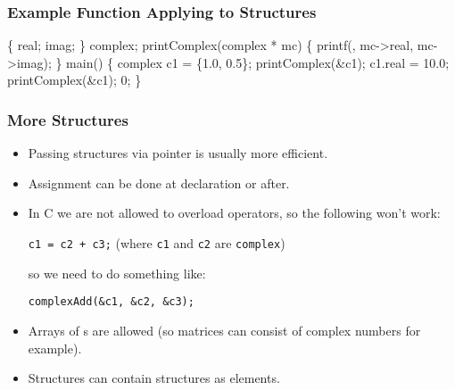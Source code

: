 \documentclass[smaller,table]{beamer} %
\begin{document}
\begin{frame}[fragile]
\frametitle{Example Function Applying to Structures}
\vspace{-0.2in}
\begin{semiverbatim}
\scriptsize
\kr\kl{} 
\kl
\kl{}
\kl\{
\kl   {} real;
\kl   {} imag;
\kl\} complex;
\kl
\kl{} printComplex(complex * mc)
\kl\{
\kl   printf(, mc->real, mc->imag);
\kl\}
\kl
\kl{} main()
\kl\{
\kl   complex c1 = \{1.0, 0.5\}; 
\kl   printComplex(&c1);       
\kl   c1.real = 10.0;          
\kl   printComplex(&c1);
\kl   {} 0;
\kl\}
\end{semiverbatim}
\end{frame}

\begin{frame}
\frametitle{More Structures}
\begin{itemize}
\item Passing structures via pointer is usually more efficient.
\item Assignment can be done at declaration or after.
\item In C we are not allowed to overload operators, so the following won't work:
\begin{center}
{\tt c1 = c2 + c3;} (where {\tt c1} and {\tt c2} are {\tt complex})
\end{center}
so we need to do something like:
\begin{center}
{\tt complexAdd(\&c1, \&c2, \&c3);}
\end{center}
\item Arrays of {\tt {}}s are allowed (so matrices can consist of complex numbers for example).
\item Structures can contain structures as elements.
\end{itemize}
\end{frame}
\end{document}
